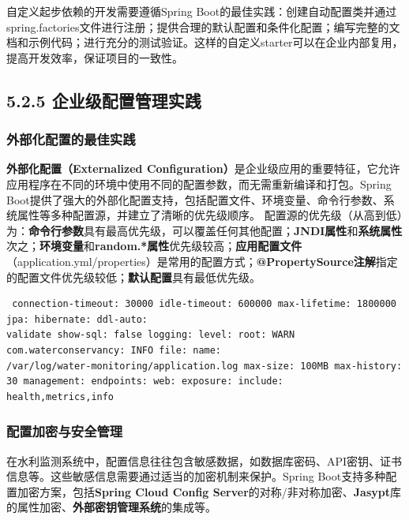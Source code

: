 自定义起步依赖的开发需要遵循Spring
Boot的最佳实践：创建自动配置类并通过spring.factories文件进行注册；提供合理的默认配置和条件化配置；编写完整的文档和示例代码；进行充分的测试验证。这样的自定义starter可以在企业内部复用，提高开发效率，保证项目的一致性。
\subsection{5.2.5 企业级配置管理实践}\label{ux4f01ux4e1aux7ea7ux914dux7f6eux7ba1ux7406ux5b9eux8df5}
\subsubsection{外部化配置的最佳实践}\label{ux5916ux90e8ux5316ux914dux7f6eux7684ux6700ux4f73ux5b9eux8df5}
\textbf{外部化配置（Externalized Configuration）}是企业级应用的重要特征，它允许应用程序在不同的环境中使用不同的配置参数，而无需重新编译和打包。Spring
Boot提供了强大的外部化配置支持，包括配置文件、环境变量、命令行参数、系统属性等多种配置源，并建立了清晰的优先级顺序。
配置源的优先级（从高到低）为：\textbf{命令行参数}具有最高优先级，可以覆盖任何其他配置；\textbf{JNDI属性}和\textbf{系统属性}次之；\textbf{环境变量}和\textbf{random.*属性}优先级较高；\textbf{应用配置文件}（application.yml/properties）是常用的配置方式；\textbf{@PropertySource注解}指定的配置文件优先级较低；\textbf{默认配置}具有最低优先级。
\begin{lstlisting} connection-timeout: 30000 idle-timeout: 600000 max-lifetime: 1800000 jpa: hibernate: ddl-auto:
validate show-sql: false logging: level: root: WARN com.waterconservancy: INFO file: name:
/var/log/water-monitoring/application.log max-size: 100MB max-history: 30 management: endpoints: web: exposure: include:
health,metrics,info \end{lstlisting}
\subsubsection{配置加密与安全管理}\label{ux914dux7f6eux52a0ux5bc6ux4e0eux5b89ux5168ux7ba1ux7406}
在水利监测系统中，配置信息往往包含敏感数据，如数据库密码、API密钥、证书信息等。这些敏感信息需要通过适当的加密机制来保护。Spring Boot支持多种配置加密方案，包括\textbf{Spring Cloud Config
Server}的对称/非对称加密、\textbf{Jasypt}库的属性加密、\textbf{外部密钥管理系统}的集成等。 \begin{lstlisting}[language=Java] \end{lstlisting}
